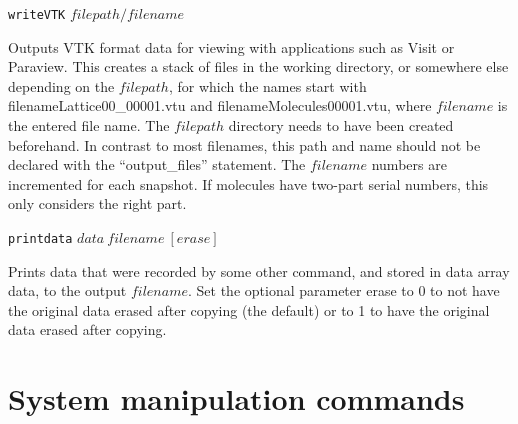 \documentclass {book}
\newcommand {\ttt} {\texttt}
\begin{document}
\begin{description}
\item{\ttt{writeVTK} $filepath/filename$}

Outputs VTK format data for viewing with applications such as Visit or Paraview. This creates a stack of files in the working directory, or somewhere else depending on the $filepath$, for which the names start with filenameLattice00\_00001.vtu and filenameMolecules00001.vtu, where $filename$ is the entered file name. The $filepath$ directory needs to have been created beforehand. In contrast to most filenames, this path and name should not be declared with the ``output\_files'' statement. The $filename$ numbers are incremented for each snapshot. If molecules have two-part serial numbers, this only considers the right part.

\item{\ttt{printdata} $data\ filename\ [erase]$}

Prints data that were recorded by some other command, and stored in data array data, to the output $filename$. Set the optional parameter erase to 0 to not have the original data erased after copying (the default) or to 1 to have the original data erased after copying.

\end{description}

\section{System manipulation commands}
\end{document}

